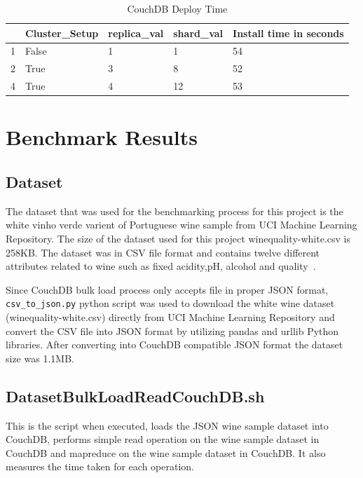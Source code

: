 \begin{table}[]
\centering
\caption{CouchDB Deploy Time}
\label{t:CouchDB-DeployTime}
\begin{tabular}{|l|l|l|l|l|}
\hline
  & \textbf{Cluster\_Setup} & \textbf{replica\_val} & \textbf{shard\_val} & \textbf{Install time in seconds} \\ \hline
1 & False                   & 1                     & 1                   & 54                               \\ \hline
2 & True                    & 3                     & 8                   & 52                               \\ \hline
4 & True                    & 4                     & 12                  & 53                               \\ \hline
\end{tabular}
\end{table}

\section{Benchmark Results}
\subsection{Dataset}
The dataset that was used for the benchmarking process for this
project is the white vinho verde varient of Portuguese wine sample
from UCI Machine Learning Repository. The size of the dataset used for
this project winequality-white.csv is 258KB. The dataset was in CSV file
format and contains twelve different attributes related to wine such
as fixed acidity,pH, alcohol and quality~\cite{www-WineQuality}. 

Since CouchDB bulk load process only accepts file in proper JSON
format, \verb|csv_to_json.py| python script was used to download the
white wine dataset (winequality-white.csv) directly from UCI Machine
Learning Repository and convert the CSV file into JSON format by utilizing
pandas and urllib Python libraries. After converting into CouchDB
compatible JSON format the dataset size was 1.1MB.

\subsection{DatasetBulkLoadReadCouchDB.sh}
This is the script when executed, loads the JSON wine sample dataset
into CouchDB, performs simple read operation on the wine sample
dataset in CouchDB and mapreduce on the wine sample
dataset in CouchDB. It also measures the time taken for each operation.

